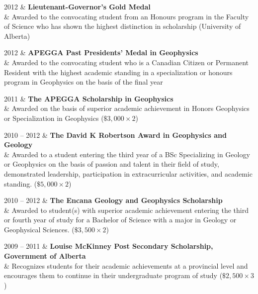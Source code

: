 \documentclass[a4paper, 11pt]{article}
\begin{document}
\begin{entryright}
2012 & \textbf{Lieutenant-Governor’s Gold Medal} \\
& Awarded to the convocating student from an Honours program in the Faculty of Science who has shown the highest distinction in scholarship (University of Alberta)
\end{entryright}

\begin{entryright}
2012 & \textbf{APEGGA Past Presidents’ Medal in Geophysics} \\
& Awarded to the convocating student who is a Canadian Citizen or Permanent Resident with the highest academic standing in a specialization or honours program in Geophysics on the basis of the final year
\end{entryright}

\begin{entryright}
2011 & \textbf{The APEGGA Scholarship in Geophysics} \\
& Awarded on the basis of superior academic achievement in Honors Geophysics or Specialization in Geophysics ($\$3,000 \times 2$)
\end{entryright}

\begin{entryright}
2010 -- 2012 & \textbf{The David K Robertson Award in Geophysics and Geology} \\
& Awarded to a student entering the third year of a BSc Specializing in Geology or Geophysics on the basis of passion and talent in their field of study, demonstrated leadership, participation in extracurricular activities, and academic standing. ($\$5,000 \times 2$)
\end{entryright}

\begin{entryright}
2010 -- 2012 & \textbf{The Encana Geology and Geophysics Scholarship} \\
& Awarded to student(s) with superior academic achievement entering the third or fourth year of study for a Bachelor of Science with a major in Geology or Geophysical Sciences. ($\$3,500 \times 2$)
\end{entryright}

\begin{entryright}
2009 -- 2011 & \textbf{Louise McKinney Post Secondary Scholarship, Government of Alberta} \\
& Recognizes students for their academic achievements at a provincial level and encourages them to continue in their undergraduate program of study ($\$2,500 \times 3$)
\end{entryright}
\end{document}
